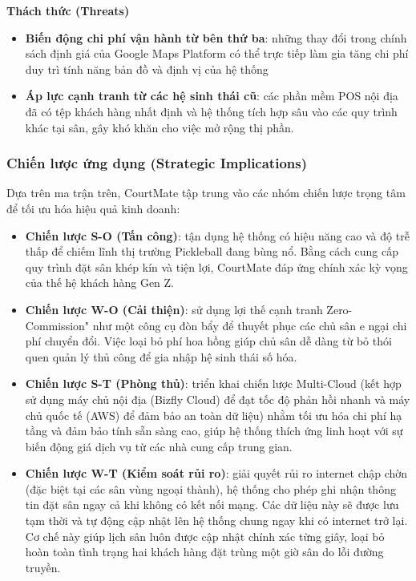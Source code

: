 \noindent \textbf{Thách thức (Threats)}
\begin{itemize}
    \item \textbf{Biến động chi phí vận hành từ bên thứ ba}: những thay đổi trong chính sách định giá của Google Maps Platform có thể trực tiếp làm gia tăng chi phí duy trì tính năng bản đồ và định vị của hệ thống
    \item \textbf{Áp lực cạnh tranh từ các hệ sinh thái cũ}: các phần mềm POS nội địa đã có tệp khách hàng nhất định và hệ thống tích hợp sâu vào các quy trình khác tại sân, gây khó khăn cho việc mở rộng thị phần.
\end{itemize}

\subsubsection{Chiến lược ứng dụng (Strategic Implications)}
Dựa trên ma trận trên, CourtMate tập trung vào các nhóm chiến lược trọng tâm để tối ưu hóa hiệu quả kinh doanh:
\begin{itemize}
    \item \textbf{Chiến lược S-O (Tấn công)}: tận dụng hệ thống có hiệu năng cao và độ trễ thấp để chiếm lĩnh thị trường Pickleball đang bùng nổ. Bằng cách cung cấp quy trình đặt sân khép kín và tiện lợi, CourtMate đáp ứng chính xác kỳ vọng của thế hệ khách hàng Gen Z.
    \item \textbf{Chiến lược W-O (Cải thiện)}: sử dụng lợi thế cạnh tranh Zero-Commission" như một công cụ đòn bẩy để thuyết phục các chủ sân e ngại chi phí chuyển đổi. Việc loại bỏ phí hoa hồng giúp chủ sân dễ dàng từ bỏ thói quen quản lý thủ công để gia nhập hệ sinh thái số hóa.
    \item \textbf{Chiến lược S-T (Phòng thủ)}: triển khai chiến lược Multi-Cloud (kết hợp sử dụng máy chủ nội địa (Bizfly Cloud) để đạt tốc độ phản hồi nhanh và máy chủ quốc tế (AWS) để đảm bảo an toàn dữ liệu) nhằm tối ưu hóa chi phí hạ tầng và đảm bảo tính sẵn sàng cao, giúp hệ thống thích ứng linh hoạt với sự biến động giá dịch vụ từ các nhà cung cấp trung gian.
    \item \textbf{Chiến lược W-T (Kiểm soát rủi ro)}: giải quyết rủi ro internet chập chờn (đặc biệt tại các sân vùng ngoại thành), hệ thống cho phép ghi nhận thông tin đặt sân ngay cả khi không có kết nối mạng. Các dữ liệu này sẽ được lưu tạm thời và tự động cập nhật lên hệ thống chung ngay khi có internet trở lại. Cơ chế này giúp lịch sân luôn được cập nhật chính xác từng giây, loại bỏ hoàn toàn tình trạng hai khách hàng đặt trùng một giờ sân do lỗi đường truyền.
\end{itemize}